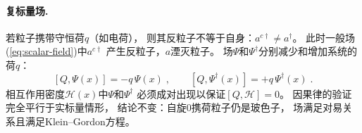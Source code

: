 \paragraph{复标量场.}
若粒子携带守恒荷$q$（如电荷），
则其反粒子不等于自身：$a^{c\dagger}\neq a^{\dagger}$。
此时一般场(\ref{eq:scalar-field})中$a^{c\dagger}$
产生反粒子，$a$湮灭粒子。
场$\Psi$和$\Psi^{\dagger}$分别减少和增加系统的荷$q$：
\[
  [Q,\Psi(x)]=-q\,\Psi(x)\;,\qquad
  [Q,\Psi^{\dagger}(x)]=+q\,\Psi^{\dagger}(x)\;.
\]
相互作用密度$\mathscr{H}(x)$中$\Psi$和$\Psi^{\dagger}$
必须成对出现以保证$[Q,\mathscr{H}]=0$。
因果律的验证完全平行于实标量情形，
结论不变：自旋$0$携荷粒子仍是玻色子，
场满足对易关系且满足Klein--Gordon方程。
